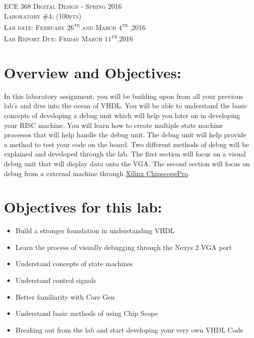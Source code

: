 \documentclass{article}
\begin{document}
\begin{center}
\textsc{\huge ECE 368 Digital Design - Spring 2016}\\[1cm]
\textsc{{\LARGE Laboratory \#4: (100pts)}}\\[0.5cm]
\textsc{\Large Lab date: February $26$\textsuperscript{th} and March $4$\textsuperscript{th} ,2016}\\[0.5cm]
\textsc{\Large Lab Report Due: Friday March $11$\textsuperscript{th},2016}\\[1cm]
\end{center}

\section{Overview and Objectives:}
In this laboratory assignment, you will be building upon from all your previous lab's and dive into the ocean of VHDL. You will be able to understand the basic concepts of developing a debug unit which will help you later on in developing your RISC machine. You will learn how to create multiple state machine processes that will help handle the debug unit. The debug unit will help provide a method to test your code on the board. Two different methods of debug will be explained and developed through the lab. The first section will focus on a visual debug unit that will display data onto the VGA. The second section will focus on debug from a external machine through \href{http://www.xilinx.com/products/design-tools/chipscopepro.html}{Xilinx\textsuperscript{\textregistered} Chipscope\texttrademark Pro}.

\section{Objectives for this lab:}
\begin{itemize}
  \item Build a stronger foundation in understanding VHDL
  \item Learn the process of visually debugging through the Nexys 2 VGA port
  \item Understand concepts of state machines
  \item Understand control signals
  \item Better familiarity with Core Gen
  \item Understand basic methods of using Chip Scope
  \item Breaking out from the lab and start developing your very own VHDL Code
\end{itemize}
\end{document}
